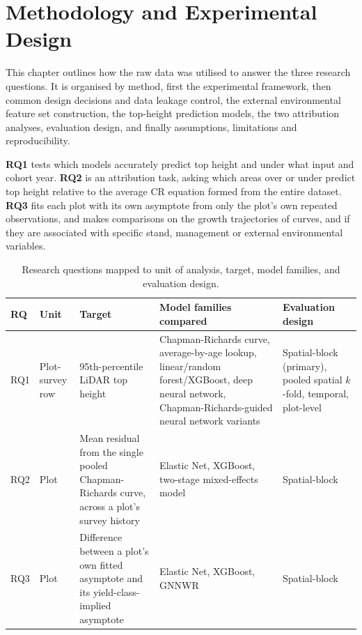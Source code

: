 \documentclass[logo,msc,ai]{infthesis}           %
\begin{document}

\chapter{Methodology and Experimental Design}
\label{ch:methodology}

This chapter outlines how the raw data was utilised to answer the three research questions. It is organised by method, first the experimental framework, then common design decisions and data leakage control, the external environmental feature set construction, the top-height prediction models, the two attribution analyses, evaluation design, and finally assumptions, limitations and reproducibility.

\textbf{RQ1} tests which models accurately predict top height and under what input and cohort year. \textbf{RQ2} is an attribution task, asking which areas over or under predict top height relative to the average CR equation formed from the entire dataset. \textbf{RQ3} fits each plot with its own asymptote from only the plot's own repeated observations, and makes comparisons on the growth trajectories of curves, and if they are associated with specific stand, management or external environmental variables.

\begin{table}[!htbp]
\scriptsize
\renewcommand{\arraystretch}{1.2}
\begin{tabular}{p{0.8cm}p{1.4cm}p{3.3cm}p{4.2cm}p{2.9cm}}
\toprule
RQ & Unit & Target & Model families compared & Evaluation design \\
\midrule
RQ1 & Plot-survey row & 95th-percentile LiDAR top height & Chapman-Richards curve, average-by-age
lookup, linear/random forest/XGBoost, deep neural network, Chapman-Richards-guided neural network
variants & Spatial-block (primary), pooled spatial $k$-fold, temporal, plot-level \\
RQ2 & Plot & Mean residual from the single pooled Chapman-Richards curve, across a plot's survey
history & Elastic Net, XGBoost, two-stage mixed-effects model & Spatial-block \\
RQ3 & Plot & Difference between a plot's own fitted asymptote and its yield-class-implied
asymptote & Elastic Net, XGBoost, GNNWR & Spatial-block \\
\bottomrule
\end{tabular}
\caption{Research questions mapped to unit of analysis, target, model families, and evaluation
design.}
\label{tab:rq-framework}
\end{table}
\end{document}
